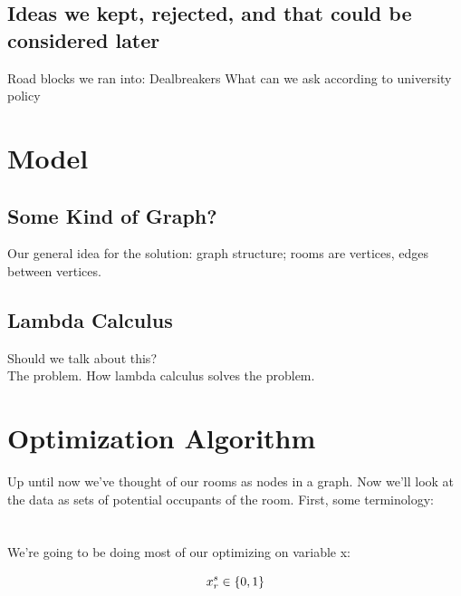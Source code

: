 \documentclass[12pt]{article}
\begin{document}
\begin{multicols}{2}
\subsection{Ideas we kept, rejected, and that could be considered later}
Road blocks we ran into:
Dealbreakers
What can we ask according to university policy

\section{Model}

\subsection{Some Kind of Graph?}
Our general idea for the solution:
graph structure; rooms are vertices, edges between vertices.

\subsection{Lambda Calculus}
Should we talk about this?\\
The problem. 
How lambda calculus solves the problem.

\end{multicols}

\section{Optimization Algorithm}

Up until now we've thought of our rooms as nodes in a graph. Now we'll look at the data as sets of potential occupants of the room. First, some terminology:\\

\\
\\ 

\noindent We're going to be doing most of our optimizing on variable x:

\begin{equation*}
\noindent{x_r^s \in \{0, 1\}\\} 
\end{equation*}


\\
\end{document}
